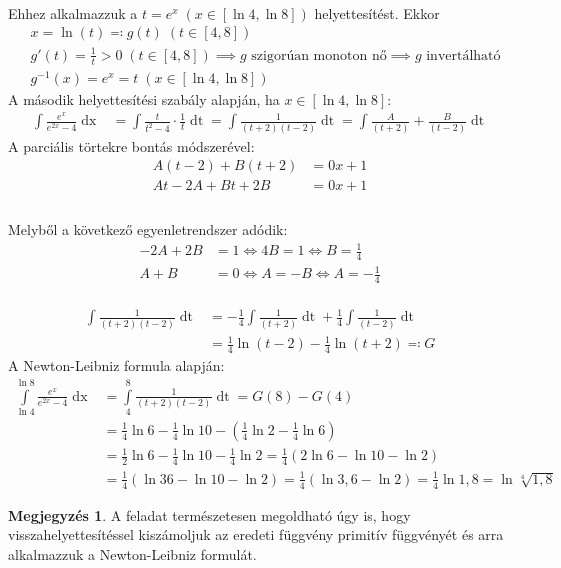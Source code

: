 \documentclass[a4paper,12pt]{article}
\theoremstyle{definition}
\newtheorem*{remark}{Megjegyzés}
\begin{document}
\begin{question}
\begin{tasks}
			\\[4pt]
			Ehhez alkalmazzuk a $t = e^x \; \left( x \in \left[ \ln 4, \ln 8 \right]  \right) $ helyettesítést.  Ekkor
			\begin{align*}
				&x = \ln(t) \eqcolon g(t) \; \left( t \in \left[ 4, 8 \right]  \right) \\
				&g'(t) = \frac{1}{t} > 0 \; \left( t \in \left[4,8\right]\right) \implies g \text{ szigorúan monoton nő} \implies g\text{ invertálható} \\
				&g^{-1}(x) = e^x = t \; \left( x \in \left[ \ln 4, \ln 8 \right]  \right)
			\end{align*}
			A második helyettesítési szabály alapján, ha $ x \in \left[ \ln 4, \ln 8 \right] $:
			\begin{align*}
				\int{\frac{e^x}{e^{2x}-4} \mathop{dx}} &= \int{\frac{t}{t^2-4} \cdot \frac{1}{t} \mathop{dt}} = \int{\frac{1}{(t+2)(t-2)} \mathop{dt}} = \int{\frac{A}{(t+2)} + \frac{B}{(t-2)} \mathop{dt}}
			\end{align*}
			A parciális törtekre bontás módszerével:
			\begin{align*}
				A(t-2)+B(t+2) &= 0x+1 \\
				At-2A+Bt+2B &= 0x+1 \\
			\end{align*}
			\\[-40pt]
			Melyből a következő egyenletrendszer adódik:
			\begin{align*}
				-2A + 2B &= 1 \iff 4B = 1 \iff B = \frac{1}{4} \\
				A+B &= 0 \iff A = -B \iff A = -\frac{1}{4}
			\end{align*}
			\\[-40pt]
			\begin{align*}
				\int{\frac{1}{(t+2)(t-2)} \mathop{dt}} &= -\frac{1}{4} \int{\frac{1}{(t+2)} \mathop{dt} + \frac{1}{4} \int{\frac{1}{(t-2)}} \mathop{dt}} \\
				&= \frac{1}{4} \ln(t-2) - \frac{1}{4} \ln (t+2) \eqcolon G
			\end{align*}
			A Newton-Leibniz formula alapján:
			\begin{align*}
				\int\limits_{\ln 4}^{\ln 8}{\frac{e^x}{e^{2x}-4} \mathop{dx}} &= \int\limits_{4}^{8}{\frac{1}{(t+2)(t-2)} \mathop{dt}} = G(8) - G(4) \\
				&= \frac{1}{4} \ln 6 - \frac{1}{4} \ln 10 - \left(\frac{1}{4} \ln 2 - \frac{1}{4} \ln 6\right) \\
				&= \frac{1}{2} \ln 6 - \frac{1}{4} \ln 10 - \frac{1}{4} \ln 2 = \frac{1}{4} \left( 2\ln 6 - \ln 10 - \ln 2 \right) \\
				&= \frac{1}{4} \left( \ln 36 - \ln 10 - \ln 2 \right) = \frac{1}{4} ( \ln{3,6} - \ln 2 ) = \frac{1}{4} \ln 1,8 = \ln \sqrt[4]{1,8}
			\end{align*}
			\begin{remark}
				A feladat természetesen megoldható úgy is, hogy visszahelyettesítéssel kiszámoljuk az eredeti függvény primitív függvényét és arra alkalmazzuk a Newton-Leibniz formulát.
			\end{remark}
		\end{tasks} 
	\end{question}
\end{document}
